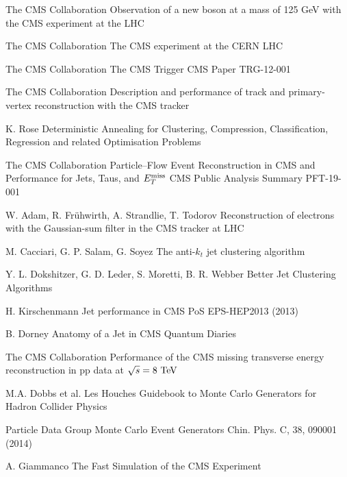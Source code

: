 \begin{thebibliography}{2}
{The CMS Collaboration}
{Observation of a new boson at a mass of 125 GeV with the CMS experiment at the LHC}
{}

{The CMS Collaboration}
{The CMS experiment at the CERN LHC}
{}

{The CMS Collaboration}
{The CMS Trigger}
{CMS Paper TRG-12-001}

{The CMS Collaboration}
{Description and performance of track and primary-vertex reconstruction with the CMS tracker}
{}

{K. Rose}
{Deterministic Annealing for Clustering, Compression, Classification, Regression and related Optimisation Problems}
{}

{The CMS Collaboration}
{Particle–Flow Event Reconstruction in CMS and Performance for Jets, Taus, and $E_T^\text{miss}$}
{CMS Public Analysis Summary PFT-19-001}

{W. Adam, R. Frühwirth, A. Strandlie, T. Todorov}
{Reconstruction of electrons with the Gaussian-sum filter in the CMS tracker at LHC}
{}

{M. Cacciari, G. P. Salam, G. Soyez}
{The anti-$k_t$ jet clustering algorithm}
{}

{Y. L. Dokshitzer, G. D. Leder, S. Moretti, B. R. Webber}
{Better Jet Clustering Algorithms}
{}

{H. Kirschenmann}
{Jet performance in CMS}
{PoS EPS-HEP2013 (2013)}

{B. Dorney}
{Anatomy of a Jet in CMS}
{Quantum Diaries}

{The CMS Collaboration}
{Performance of the CMS missing transverse energy reconstruction in pp data at $\sqrt{s} = 8~\text{TeV}$}
{}

{M.A. Dobbs et al.}
{Les Houches Guidebook to Monte Carlo Generators for Hadron Collider Physics}
{

{Particle Data Group}
{Monte Carlo Event Generators}
{Chin. Phys. C, 38, 090001 (2014)}

{A. Giammanco}
{The Fast Simulation of the CMS Experiment}
{}

}
\end{thebibliography}
